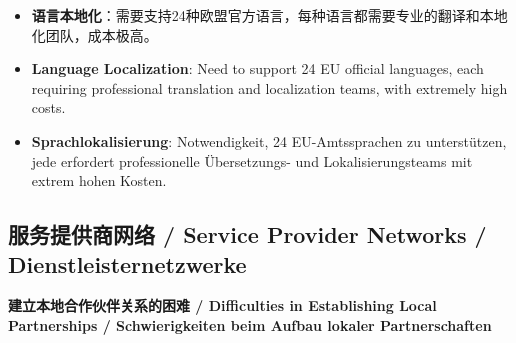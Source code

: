 \documentclass[11pt,a4paper]{article}
\begin{document}
\begin{itemize}
    \item \textbf{语言本地化}：需要支持24种欧盟官方语言，每种语言都需要专业的翻译和本地化团队，成本极高。
    \item \textbf{Language Localization}: Need to support 24 EU official languages, each requiring professional translation and localization teams, with extremely high costs.
    \item \textbf{Sprachlokalisierung}: Notwendigkeit, 24 EU-Amtssprachen zu unterstützen, jede erfordert professionelle Übersetzungs- und Lokalisierungsteams mit extrem hohen Kosten.
\end{itemize}

\subsection{服务提供商网络 / Service Provider Networks / Dienstleisternetzwerke}

\textbf{建立本地合作伙伴关系的困难 / Difficulties in Establishing Local Partnerships / Schwierigkeiten beim Aufbau lokaler Partnerschaften}
\end{document}
